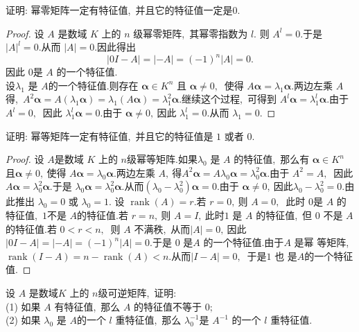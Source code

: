 \newpage
\begin{problem}
	证明: 幂零矩阵一定有特征值,\  并且它的特征值一定是$0.$
\end{problem}
\begin{proof}
	设  $A $ 是数域 $ K $ 上的 $ n $ 级幂零矩阵,\  其幂零指数为  $l. $ 则 $ A^{l}=0 .$于是 $ |A|^{l}=0 .$从而 $ |A|=0 .$因此得出
	$$|0 I-A|=|-A|=(-1)^{n}|A|=0 .$$
	因此 $0 $是  $A $ 的一个特征值.\\
	设$  \lambda_{1} $ 是 $ A  $的一个特征值.则存在 $ \boldsymbol{\alpha} \in K^{n} $ 且  $\boldsymbol{\alpha} \neq 0 ,\ $ 使得 $ A \boldsymbol{\alpha}=\lambda_{1} \boldsymbol{\alpha}  .$两边左乘 $ A$  得,\  $ A^{2} \boldsymbol{\alpha}   =A\left(\lambda_{1} \boldsymbol{\alpha}\right)=\lambda_{1}(A \boldsymbol{\alpha})=\lambda_{1}^{2} \boldsymbol{\alpha} .$继续这个过程,\  可得到 $ A^{l} \boldsymbol{\alpha}=\lambda_{1}^{l} \boldsymbol{\alpha}.$由于 $ A^{l}=0 ,\ $ 因此 $ \lambda_{1}^{l} \boldsymbol{\alpha}=0 . $由于  $\boldsymbol{\alpha} \neq 0 ,\  $因此 $ \lambda_{1}^{l}=0.$从而  $\lambda_{1}=0  .$
\end{proof}
\newpage
\begin{problem}
	证明: 幂等矩阵一定有特征值,\  并且它的特征值是 $1$ 或者 $0.$
\end{problem}
\begin{proof}
	设  $A  $是数域  $K$  上的 $ n  $级幂等矩阵.如果$  \lambda_{0} $ 是 $ A $ 的特征值,\  那么有 $ \boldsymbol{\alpha} \in K^{n} $ 且$  \boldsymbol{\alpha} \neq 0 ,\  $使得  $A \boldsymbol{\alpha}=\lambda_{0} \boldsymbol{\alpha} .$两边左乘  $A ,\  $得$  A^{2} \boldsymbol{\alpha}=A \lambda_{0} \boldsymbol{\alpha}=\lambda_{0}^{2} \boldsymbol{\alpha}  .$由于 $ A^{2}=A ,\ $ 因此  $A \boldsymbol{\alpha}=   \lambda_{0}^{2} \boldsymbol{\alpha} .$于是  $\lambda_{0} \boldsymbol{\alpha}=\lambda_{0}^{2} \boldsymbol{\alpha} .$从而$  \left(\lambda_{0}-\lambda_{0}^{2}\right) \boldsymbol{\alpha}=0 .$由于  $\boldsymbol{\alpha} \neq 0 ,\  $因此$  \lambda_{0}-\lambda_{0}^{2}=0.$由此推出  $\lambda_{0}=0$  或  $\lambda_{0}=1.$
	设  $\operatorname{rank}(A)=r  .$若  $r=0 ,\  $则 $ A=0 ,\ $ 此时 $0 $是  $A $ 的特征值,\  $1 $不是  $A  $的特征值.若 $ r=n ,\  $则  $A=I ,\  $此时$ 1$ 是  $A$  的特征值,\  但 $0$ 不是  $A$  的特征值.若 $ 0<r<n ,\ $ 则  $A $ 不满秩,\  从而$  |A|=0 ,\  $因此  $|0 I-A|=|-A|=(-1)^{n}|A|=0 .$于是 $0$ 是$  A$  的一个特征值.由于$  A $ 是幂 等矩阵,\ $ \operatorname{rank}(I-A)=n-\operatorname{rank}(A)<n .$从而$  |I-A|=0 ,\ $ 于是$ 1$ 也 是$  A  $的一个特征值.
\end{proof}
\newpage
\begin{problem}
	设 $ A $ 是数域$  K $ 上的 $ n  $级可逆矩阵,\  证明:\\
	(1) 如果  $A$  有特征值,\  那么  $A$  的特征值不等于 $0 ;$\\
	(2) 如果  $\lambda_{0}$  是 $ A  $的一个  $l $ 重特征值,\  那么  $\lambda_{0}^{-1}  $是  $A^{-1} $ 的一个 $ l $ 重特征值.
\end{problem}
